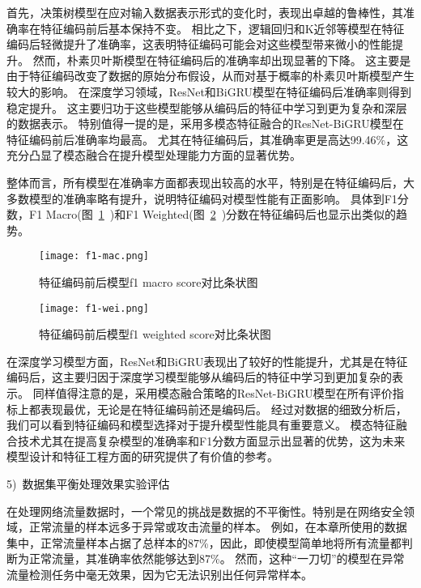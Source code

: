首先，决策树模型在应对输入数据表示形式的变化时，表现出卓越的鲁棒性，其准确率在特征编码前后基本保持不变。
相比之下，逻辑回归和K近邻等模型在特征编码后轻微提升了准确率，这表明特征编码可能会对这些模型带来微小的性能提升。
然而，朴素贝叶斯模型在特征编码后的准确率却出现显著的下降。
这主要是由于特征编码改变了数据的原始分布假设，从而对基于概率的朴素贝叶斯模型产生较大的影响。
在深度学习领域，ResNet和BiGRU模型在特征编码后准确率则得到稳定提升。
这主要归功于这些模型能够从编码后的特征中学习到更为复杂和深层的数据表示。
特别值得一提的是，采用多模态特征融合的ResNet-BiGRU模型在特征编码前后准确率均最高。
尤其在特征编码后，其准确率更是高达99.46\%，这充分凸显了模态融合在提升模型处理能力方面的显著优势。\par


整体而言，所有模型在准确率方面都表现出较高的水平，特别是在特征编码后，大多数模型的准确率略有提升，说明特征编码对模型性能有正面影响。
具体到F1分数，F1 Macro(图~\ref{fig:f1_macro_score}~)和F1 Weighted(图~\ref{fig:f1_weighted_score}~)分数在特征编码后也显示出类似的趋势。
\begin{figure}[htbp]
	\centering
	\texttt{[image: f1-mac.png]}
	\caption{特征编码前后模型f1 macro score对比条状图}
	\label{fig:f1_macro_score}
\end{figure}
\begin{figure}[htbp]
	\centering
	\texttt{[image: f1-wei.png]}
	\caption{特征编码前后模型f1 weighted score对比条状图}
	\label{fig:f1_weighted_score}
\end{figure}
在深度学习模型方面，ResNet和BiGRU表现出了较好的性能提升，尤其是在特征编码后，这主要归因于深度学习模型能够从编码后的特征中学习到更加复杂的表示。
同样值得注意的是，采用模态融合策略的ResNet-BiGRU模型在所有评价指标上都表现最优，无论是在特征编码前还是编码后。
经过对数据的细致分析后，我们可以看到特征编码和模型选择对于提升模型性能具有重要意义。
模态特征融合技术尤其在提高复杂模型的准确率和F1分数方面显示出显著的优势，这为未来模型设计和特征工程方面的研究提供了有价值的参考。\par

5)~数据集平衡处理效果实验评估\par
在处理网络流量数据时，一个常见的挑战是数据的不平衡性。特别是在网络安全领域，正常流量的样本远多于异常或攻击流量的样本。
例如，在本章所使用的数据集中，正常流量样本占据了总样本的87\%，因此，即使模型简单地将所有流量都判断为正常流量，其准确率依然能够达到87\%。
然而，这种“一刀切”的模型在异常流量检测任务中毫无效果，因为它无法识别出任何异常样本。\par

